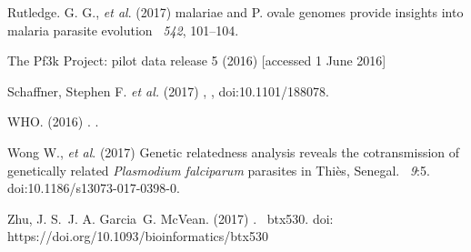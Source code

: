 \documentclass{article}
\begin{document}
\begin{thebibliography}{}
Rutledge. G. G., {\em et al}. (2017)
 malariae and P. ovale genomes provide insights into malaria parasite evolution
~{\em 542}, 101--104.


The Pf3k Project: pilot data release 5 (2016)
 [accessed 1 June 2016]


Schaffner, Stephen F. {\em et al.} (2017)
,
, doi:10.1101/188078.

WHO. (2016)
.
.

Wong W., {\em et al}. (2017)
\newblock Genetic relatedness analysis reveals the cotransmission of genetically related {\it Plasmodium falciparum} parasites in Thiès, Senegal.
~{\em 9}:5. doi:10.1186/s13073-017-0398-0.


Zhu, J. S.\, J. A. Garcia\, G. McVean. (2017)
.
~{\em \/}btx530. doi: https://doi.org/10.1093/bioinformatics/btx530

\end{thebibliography}
\end{document}
